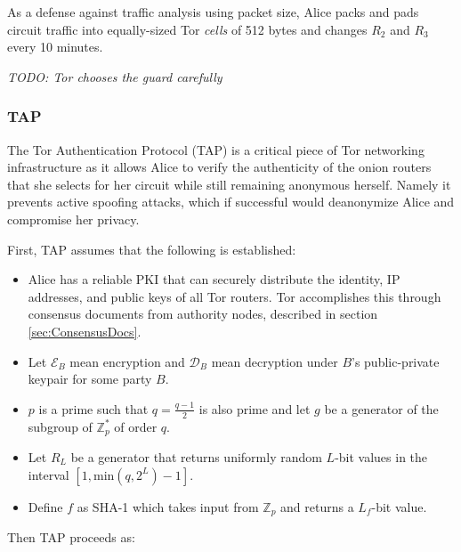 As a defense against traffic analysis using packet size, Alice packs and pads circuit traffic into equally-sized Tor \emph{cells} of 512 bytes and changes $ R_{2} $ and $ R_{3} $ every 10 minutes.\cite{mccoy2008shining}

\emph{TODO: Tor chooses the guard carefully}

\subsubsection{TAP}

The Tor Authentication Protocol (TAP) is a critical piece of Tor networking infrastructure as it allows Alice to verify the authenticity of the onion routers that she selects for her circuit while still remaining anonymous herself. Namely it prevents active spoofing attacks, which if successful would deanonymize Alice and compromise her privacy.

First, TAP assumes that the following is established:

\begin{itemize}
	\item Alice has a reliable PKI that can securely distribute the identity, IP addresses, and public keys of all Tor routers. Tor accomplishes this through consensus documents from authority nodes, described in section \ref{sec:ConsensusDocs}.
	\item Let $ \mathcal{E}_{B} $ mean encryption and $ \mathcal{D}_{B} $ mean decryption under $ B $'s public-private keypair for some party $ B $.
	\item $ p $ is a prime such that $ q = \frac{q - 1}{2} $ is also prime and let $ g $ be a generator of the subgroup of $ \mathbb{Z}^{*}_{p} $ of order $ q $.
	\item Let $ R_{L} $ be a generator that returns uniformly random $ L $-bit values in the interval $ [1, \textrm{min}(q, 2 ^ L) - 1] $.
	\item Define $ f $ as SHA-1 which takes input from $ \mathbb{Z}_{p} $ and returns a $ L_{f} $-bit value.
\end{itemize}

Then TAP proceeds as:

